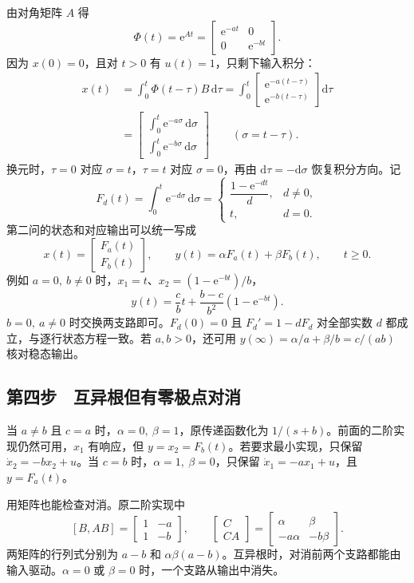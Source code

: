 由对角矩阵 $A$ 得
\[
 \Phi(t)=\mathrm e^{At}=\begin{bmatrix}\mathrm e^{-at}&0\\0&\mathrm e^{-bt}\end{bmatrix}.
\]
因为 $x(0)=0$，且对 $t>0$ 有 $u(t)=1$，只剩下输入积分：
\[
\begin{aligned}
 x(t)
 &=\int_0^t\Phi(t-\tau)B\,\mathrm d\tau
 =\int_0^t\begin{bmatrix}\mathrm e^{-a(t-\tau)}\\
                            \mathrm e^{-b(t-\tau)}\end{bmatrix}\mathrm d\tau\\
 &=\begin{bmatrix}\displaystyle\int_0^t\mathrm e^{-a\sigma}\,\mathrm d\sigma\\
                    \displaystyle\int_0^t\mathrm e^{-b\sigma}\,\mathrm d\sigma\end{bmatrix}
 \qquad(\sigma=t-\tau).
\end{aligned}
\]
换元时，$\tau=0$ 对应 $\sigma=t$，$\tau=t$ 对应 $\sigma=0$，再由 $\mathrm d\tau=-\mathrm d\sigma$ 恢复积分方向。记
\[
 F_d(t)=\int_0^t\mathrm e^{-d\sigma}\,\mathrm d\sigma
 =\begin{cases}
 \dfrac{1-\mathrm e^{-dt}}{d},& d\ne0,\\[4pt]
 t,&d=0 .
 \end{cases}
\]
第二问的状态和对应输出可以统一写成
\[
 \boxed{x(t)=\begin{bmatrix}F_a(t)\\F_b(t)\end{bmatrix},\qquad
 y(t)=\alpha F_a(t)+\beta F_b(t),\qquad t\ge0.}
\]
例如 $a=0,\ b\ne0$ 时，$x_1=t$、$x_2=(1-\mathrm e^{-bt})/b$，
\[
 y(t)=\frac{c}{b}t+\frac{b-c}{b^2}(1-\mathrm e^{-bt}).
\]
$b=0,\ a\ne0$ 时交换两支路即可。$F_d(0)=0$ 且 $F_d'=1-dF_d$ 对全部实数 $d$ 都成立，与逐行状态方程一致。若 $a,b>0$，还可用 $y(\infty)=\alpha/a+\beta/b=c/(ab)$ 核对稳态输出。

\subsection{第四步　互异根但有零极点对消}

当 $a\ne b$ 且 $c=a$ 时，$\alpha=0,\ \beta=1$，原传递函数化为 $1/(s+b)$。前面的二阶实现仍然可用，$x_1$ 有响应，但 $y=x_2=F_b(t)$。若要求最小实现，只保留 $\dot x_2=-bx_2+u$。当 $c=b$ 时，$\alpha=1,\ \beta=0$，只保留 $\dot x_1=-ax_1+u$，且 $y=F_a(t)$。

用矩阵也能检查对消。原二阶实现中
\[
 [B,AB]=\begin{bmatrix}1&-a\\1&-b\end{bmatrix},\qquad
 \begin{bmatrix}C\\CA\end{bmatrix}=
 \begin{bmatrix}\alpha&\beta\\-a\alpha&-b\beta\end{bmatrix}.
\]
两矩阵的行列式分别为 $a-b$ 和 $\alpha\beta(a-b)$。互异根时，对消前两个支路都能由输入驱动。$\alpha=0$ 或 $\beta=0$ 时，一个支路从输出中消失。

